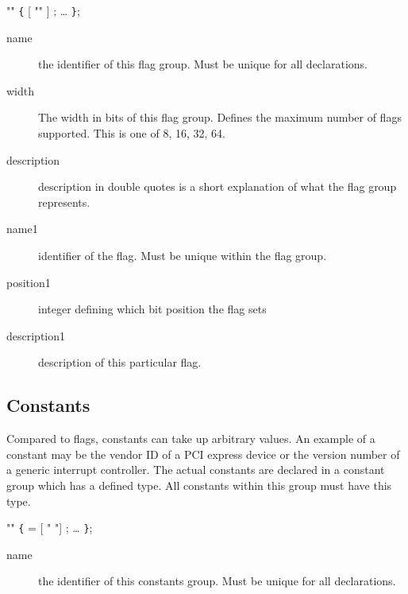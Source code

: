 \documentclass[a4paper,11pt,twoside]{report}
\begin{document}
{{\begin{syntax}
   "" \verb+{+
      [ "" ] ;
    \ldots
\verb+}+;
\end{syntax}

\begin{description}
    \item[name] the identifier of this flag group. Must be unique for all 
                declarations.
    
    \item [width] The width in bits of this flag group. Defines the maximum 
                  number of flags supported. This is one of 8, 16, 32, 64.
    
    \item [description] description in double quotes is a short explanation of
                        what the flag group represents.
    
    \item [name1] identifier of the flag. Must be unique within the flag 
                  group. 
    
    \item [position1] integer defining which bit position the flag sets
    
    \item [description1] description of this particular flag.
\end{description}

\subsection{Constants}

Compared to flags, constants can take up arbitrary values. An example of a 
constant may be the vendor ID of a PCI express device or the version number
of a generic interrupt controller. The actual constants are declared in a 
constant group which has a defined type. All constants within this group 
must have this type.

\begin{syntax}
   "" \verb+{+
     =  [ " "] ;
    \ldots
\verb+}+;
\end{syntax}

\begin{description}
    \item[name] the identifier of this constants group. Must be unique for all 
                declarations.
    

\end{description}}}
\end{document}
